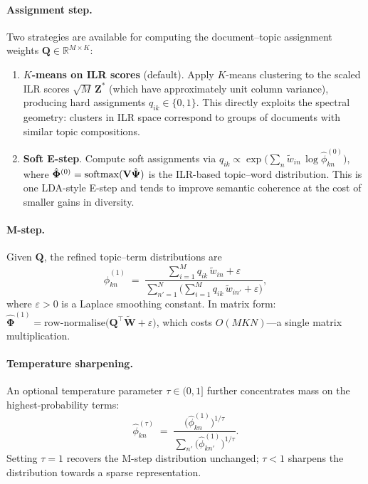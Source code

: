 \paragraph{Assignment step.}
Two strategies are available for computing the document--topic
assignment weights $\mathbf{Q}\in\mathbb{R}^{M\times K}$:

\begin{enumerate}
  \item[\emph{(a)}]
    \textbf{$K$-means on ILR scores} (default).
    Apply $K$-means clustering to the scaled ILR scores
    $\sqrt{M}\,\mathbf{Z}^*$ (which have approximately unit
    column variance), producing hard assignments
    $q_{ik}\in\{0,1\}$.
    This directly exploits the spectral geometry:
    clusters in ILR space correspond to groups of documents with
    similar topic compositions.

  \item[\emph{(b)}]
    \textbf{Soft E-step}.
    Compute soft assignments via
    $q_{ik}\propto\exp\bigl(\sum_n\widetilde{w}_{in}\,
    \log\hat\phi^{(0)}_{kn}\bigr)$,
    where
    $\hat{\boldsymbol{\Phi}}^{(0)}
    = \operatorname{softmax}(\mathbf{V}\hat{\boldsymbol{\Psi}})$
    is the ILR-based topic--word distribution.
    This is one LDA-style E-step and tends to improve semantic
    coherence at the cost of smaller gains in diversity.
\end{enumerate}

\paragraph{M-step.}
Given $\mathbf{Q}$, the refined topic--term distributions are
\begin{equation}
  \hat{\phi}^{(1)}_{kn}
  \;=\;
  \frac{\sum_{i=1}^M q_{ik}\,\widetilde{w}_{in} + \varepsilon}
       {\sum_{n'=1}^{N}\bigl(\sum_{i=1}^M q_{ik}\,
        \widetilde{w}_{in'} + \varepsilon\bigr)},
  \label{eq:mstep_phi}
\end{equation}
where $\varepsilon>0$ is a Laplace smoothing constant.
In matrix form:
$\hat{\boldsymbol{\Phi}}^{(1)}
 = \mathrm{row\text{-}normalise}\!\bigl(
     \mathbf{Q}^{\!\top}\widetilde{\mathbf{W}} + \varepsilon\bigr)$,
which costs $O(MKN)$---a single matrix multiplication.

\paragraph{Temperature sharpening.}
An optional temperature parameter $\tau\in(0,1]$ further concentrates
mass on the highest-probability terms:
\begin{equation}
  \hat{\phi}^{(\tau)}_{kn}
  \;=\;
  \frac{\bigl(\hat{\phi}^{(1)}_{kn}\bigr)^{1/\tau}}
       {\sum_{n'}\bigl(\hat{\phi}^{(1)}_{kn'}\bigr)^{1/\tau}}.
  \label{eq:temperature}
\end{equation}
Setting $\tau=1$ recovers the M-step distribution unchanged;
$\tau<1$ sharpens the distribution towards a sparse representation.

